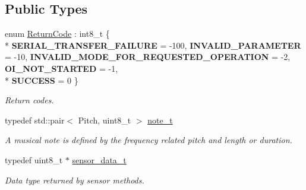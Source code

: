 \subsection*{Public Types}
\begin{DoxyCompactItemize}
\item 
\hypertarget{classroomba_1_1series500_1_1_open_interface_a43fc2ae1216e57cfb46901331b9ab4c7}{enum \hyperlink{classroomba_1_1series500_1_1_open_interface_a43fc2ae1216e57cfb46901331b9ab4c7}{Return\+Code} \+: int8\+\_\+t \{ \\*
{\bfseries S\+E\+R\+I\+A\+L\+\_\+\+T\+R\+A\+N\+S\+F\+E\+R\+\_\+\+F\+A\+I\+L\+U\+R\+E} = -\/100, 
{\bfseries I\+N\+V\+A\+L\+I\+D\+\_\+\+P\+A\+R\+A\+M\+E\+T\+E\+R} = -\/10, 
{\bfseries I\+N\+V\+A\+L\+I\+D\+\_\+\+M\+O\+D\+E\+\_\+\+F\+O\+R\+\_\+\+R\+E\+Q\+U\+E\+S\+T\+E\+D\+\_\+\+O\+P\+E\+R\+A\+T\+I\+O\+N} = -\/2, 
{\bfseries O\+I\+\_\+\+N\+O\+T\+\_\+\+S\+T\+A\+R\+T\+E\+D} = -\/1, 
\\*
{\bfseries S\+U\+C\+C\+E\+S\+S} = 0
 \}}\label{classroomba_1_1series500_1_1_open_interface_a43fc2ae1216e57cfb46901331b9ab4c7}

\begin{DoxyCompactList}\small\item\em Return codes. \end{DoxyCompactList}\item 
typedef std\+::pair$<$ Pitch, uint8\+\_\+t $>$ \hyperlink{classroomba_1_1series500_1_1_open_interface_a0c3ce39185b625b630aa156be63fd57c}{note\+\_\+t}
\begin{DoxyCompactList}\small\item\em A musical note is defined by the frequency related pitch and length or duration. \end{DoxyCompactList}\item 
typedef uint8\+\_\+t $\ast$ \hyperlink{classroomba_1_1series500_1_1_open_interface_a292dd23045ef4827673822518f08fb0f}{sensor\+\_\+data\+\_\+t}
\begin{DoxyCompactList}\small\item\em Data type returned by sensor methods. \end{DoxyCompactList}\end{DoxyCompactItemize}
